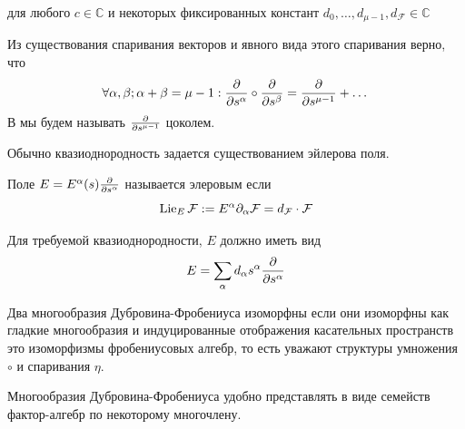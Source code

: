 для любого \(c \in \mathbb{C}\) и некоторых фиксированных констант \(d_0, \dots, d_{\mu-1}, d_\mathcal{F} \in \mathbb{C}\)\par
Из существования спаривания векторов и явного вида этого спаривания верно, что \[\forall \alpha, \beta; \alpha + \beta = \mu - 1:\tang[s^\alpha]\circ \tang[s^\beta] = \tang[s^{\mu-1}] + \dots\]
В мы будем называть \(\tang[s^{\mu-1}]\) цоколем.
\par
\begin{rem}
	Обычно квазиоднородность задается существованием эйлерова поля.\par
\end{rem}
\begin{defin}
	Поле \(E = E^\alpha(s)\tang[s^\alpha]\) называется элеровым если \[\operatorname{Lie}_E \mathcal{F} \defeq E^\alpha \partial_\alpha \mathcal{F} = d_\mathcal{F} \cdot \mathcal{F}\]
\end{defin}
Для требуемой квазиоднородности, \(E\) должно иметь вид \[E = \sum_\alpha d_\alpha s^\alpha\tang[s^\alpha]\]
\begin{defin}[Изоморфизм]
	Два многообразия Дубровина-Фробениуса изоморфны если они изоморфны как гладкие многообразия и индуцированные отображения касательных пространств это изоморфизмы фробениусовых алгебр, то есть уважают структуры умножения \(\circ\) и спаривания \(\eta\).
\end{defin}
Многообразия Дубровина-Фробениуса удобно представлять в виде семейств фактор-алгебр по некоторому многочлену.
